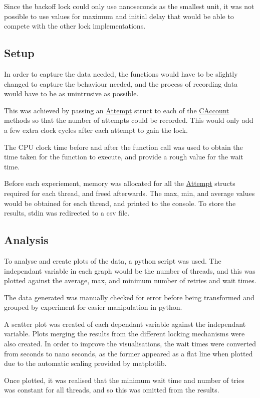 \documentclass[12pt]{article}
\begin{document}
Since the backoff lock could only use nanoseconds as the smallest unit, it was not possible to use values for maximum and initial delay that would be able to compete with the other lock implementations.

\subsection{Setup}

In order to capture the data needed, the functions would have to be slightly changed to capture the behaviour needed, and the process of recording data would have to be as unintrusive as possible. 

This was achieved by passing an \url{Attempt} struct to each of the \url{CAccount} methods so that the number of attempts could be recorded. This would only add a few extra clock cycles after each attempt to gain the lock.

The CPU clock time before and after the function call was used to obtain the time taken for the function to execute, and provide a rough value for the wait time.

Before each experiement, memory was allocated for all the \url{Attempt} structs required for each thread, and freed afterwards. The max, min, and average values would be obtained for each thread, and printed to the console. To store the results, stdin was redirected to a csv file.

\subsection{Analysis}

To analyse and create plots of the data, a python script was used. The independant variable in each graph would be the number of threads, and this was plotted against the average, max, and minimum number of retries and wait times.

The data generated was manually checked for error before being transformed and grouped by experiment for easier manipulation in python.

A scatter plot was created of each dependant variable against the independant variable. Plots merging the results from the different locking mechanisms were also created. In order to improve the visualisations, the wait times were converted from seconds to nano seconds, as the former appeared as a flat line when plotted due to the automatic scaling provided by matplotlib. 

Once plotted, it was realised that the minimum wait time and number of tries was constant for all threads, and so this was omitted from the results.
\end{document}
